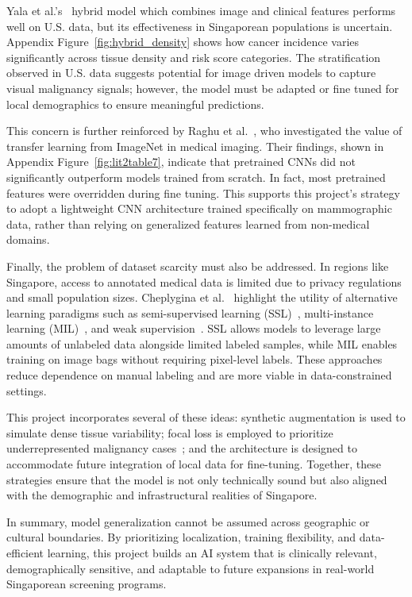 \documentclass[12pt]{article}
\begin{document}
Yala et al.’s~\cite{1} hybrid model which combines image and clinical features performs well on U.S. data, but its effectiveness in Singaporean populations is uncertain. Appendix Figure~\ref{fig:hybrid_density} shows how cancer incidence varies significantly across tissue density and risk score categories. The stratification observed in U.S. data suggests potential for image driven models to capture visual malignancy signals; however, the model must be adapted or fine tuned for local demographics to ensure meaningful predictions.

This concern is further reinforced by Raghu et al.~\cite{2}, who investigated the value of transfer learning from ImageNet in medical imaging. Their findings, shown in Appendix Figure~\ref{fig:lit2table7}, indicate that pretrained CNNs did not significantly outperform models trained from scratch. In fact, most pretrained features were overridden during fine tuning. This supports this project’s strategy to adopt a lightweight CNN architecture trained specifically on mammographic data, rather than relying on generalized features learned from non-medical domains.

Finally, the problem of dataset scarcity must also be addressed. In regions like Singapore, access to annotated medical data is limited due to privacy regulations and small population sizes. Cheplygina et al.~\cite{4} highlight the utility of alternative learning paradigms such as semi-supervised learning (SSL)~\cite{4}, multi-instance learning (MIL)~\cite{4}, and weak supervision~\cite{4}. SSL allows models to leverage large amounts of unlabeled data alongside limited labeled samples, while MIL enables training on image bags without requiring pixel-level labels. These approaches reduce dependence on manual labeling and are more viable in data-constrained settings.

This project incorporates several of these ideas: synthetic augmentation is used to simulate dense tissue variability; focal loss is employed to prioritize underrepresented malignancy cases~\cite{2}; and the architecture is designed to accommodate future integration of local data for fine-tuning. Together, these strategies ensure that the model is not only technically sound but also aligned with the demographic and infrastructural realities of Singapore.

In summary, model generalization cannot be assumed across geographic or cultural boundaries. By prioritizing localization, training flexibility, and data-efficient learning, this project builds an AI system that is clinically relevant, demographically sensitive, and adaptable to future expansions in real-world Singaporean screening programs.
\end{document}

